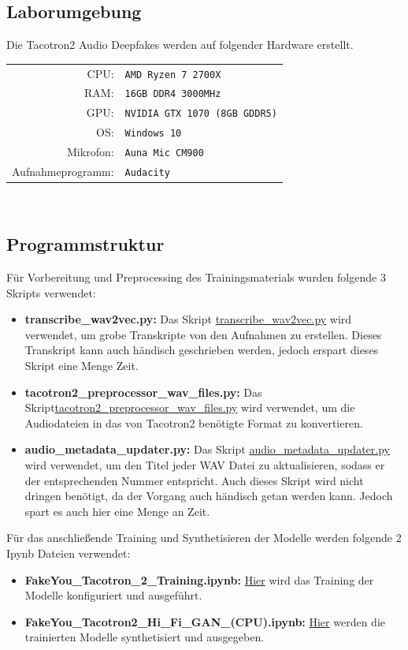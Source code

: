 \subsection{Laborumgebung}
Die Tacotron2 Audio Deepfakes werden auf folgender Hardware erstellt.\\[0.5cm]
\begin{tabular}{rl}
    CPU:& \texttt{AMD Ryzen 7 2700X}\\
    RAM:& \texttt{16GB DDR4 3000MHz}\\
    GPU:& \texttt{NVIDIA GTX 1070 (8GB GDDR5)}\\
    OS:& \texttt{Windows 10}\\
    Mikrofon:& \texttt{Auna Mic CM900}\\
    Aufnahmeprogramm:& \texttt{Audacity}
\end{tabular}\\[0.5cm]
\subsection{Programmstruktur}
Für Vorbereitung und Preprocessing des Trainingsmaterials wurden folgende 3 Skripts verwendet:
\begin{itemize}
    \item \textbf{transcribe\_wav2vec.py:} Das Skript \href{https://github.com/rasmurtech/Tacotron2-Wav2Vec-Transcription}{transcribe\_wav2vec.py} wird verwendet, um grobe Transkripte von den Aufnahmen zu erstellen. Dieses Transkript kann auch händisch geschrieben werden, jedoch erspart dieses Skript eine Menge Zeit.
    \item \textbf{tacotron2\_preprocessor\_wav\_files.py:} Das Skript\newline \href{https://github.com/rasmurtech/Tacotron-2-Audio-Preprocessor}{tacotron2\_preprocessor\_wav\_files.py} wird verwendet, um die Audiodateien in das von Tacotron2 benötigte Format zu konvertieren.
    \item \textbf{audio\_metadata\_updater.py:} Das Skript \href{https://github.com/rasmurtech/Audio-Metadata-Updater}{audio\_metadata\_updater.py} wird verwendet, um den Titel jeder WAV Datei zu aktualisieren, sodass er der entsprechenden Nummer entspricht. Auch dieses Skript wird nicht dringen benötigt, da der Vorgang auch händisch getan werden kann. Jedoch spart es auch hier eine Menge an Zeit.
\end{itemize}
Für das anschließende Training und Synthetisieren der Modelle werden folgende 2 Ipynb Dateien verwendet:
\begin{itemize}
    \item \textbf{FakeYou\_Tacotron\_2\_Training.ipynb:} \href{https://colab.research.google.com/github/justinjohn0306/FakeYou-Tacotron2-Notebook/blob/dev/FakeYou_Tacotron_2_Training.ipynb}{Hier} wird das Training der Modelle konfiguriert und ausgeführt.
    \item \textbf{FakeYou\_Tacotron2\_Hi\_Fi\_GAN\_(CPU).ipynb:} \href{https://colab.research.google.com/github/justinjohn0306/FakeYou-Tacotron2-Notebook/blob/main/FakeYou_Tacotron2_Hi_Fi_GAN_(CPU).ipynb}{Hier} werden die trainierten Modelle synthetisiert und ausgegeben.
\end{itemize}
